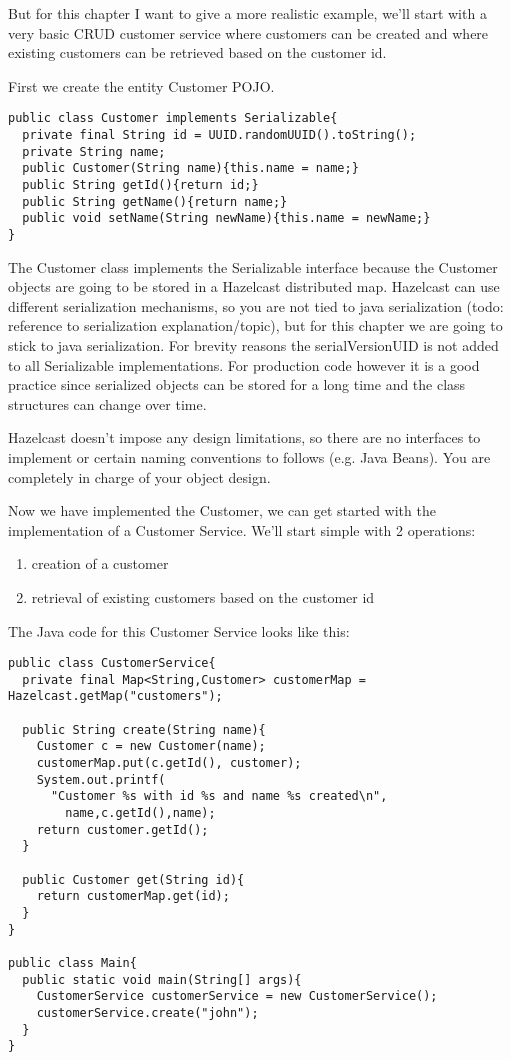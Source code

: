 



But for this chapter I want to give a more realistic example, we'll start with a  very basic CRUD customer service where customers can be created and where existing customers can be retrieved based on the customer id.

First we create the entity Customer POJO. 
\begin{verbatim}
public class Customer implements Serializable{
  private final String id = UUID.randomUUID().toString();
  private String name;
  public Customer(String name){this.name = name;}
  public String getId(){return id;}
  public String getName(){return name;}
  public void setName(String newName){this.name = newName;}
}
\end{verbatim}

The Customer class implements the Serializable interface because the Customer objects are going to be stored in a Hazelcast distributed map. Hazelcast can use different serialization mechanisms, so you are not tied to java serialization (todo: reference to serialization explanation/topic), but for this chapter we are going to stick to java serialization. For brevity reasons the serialVersionUID is not added to all Serializable implementations. For production code however it is a good practice since serialized objects can be stored for a long time and the class structures can change over time. 

Hazelcast doesn't impose any design limitations, so there are no interfaces to implement or certain naming conventions to follows (e.g. Java Beans). You are completely in charge of your object design.

Now we have implemented the Customer, we can get started with the implementation of a Customer Service. We'll start simple with 2 operations:
\begin{enumerate}
\item creation of a customer
\item retrieval of existing customers based on the customer id
\end{enumerate}

The Java code for this Customer Service looks like this:

\begin{verbatim}
public class CustomerService{
  private final Map<String,Customer> customerMap = Hazelcast.getMap("customers");
  
  public String create(String name){
    Customer c = new Customer(name);
    customerMap.put(c.getId(), customer);
    System.out.printf(
      "Customer %s with id %s and name %s created\n",
        name,c.getId(),name);
    return customer.getId();
  }
  
  public Customer get(String id){
    return customerMap.get(id);
  } 
}

public class Main{
  public static void main(String[] args){
    CustomerService customerService = new CustomerService();
    customerService.create("john");
  }
}
\end{verbatim}


